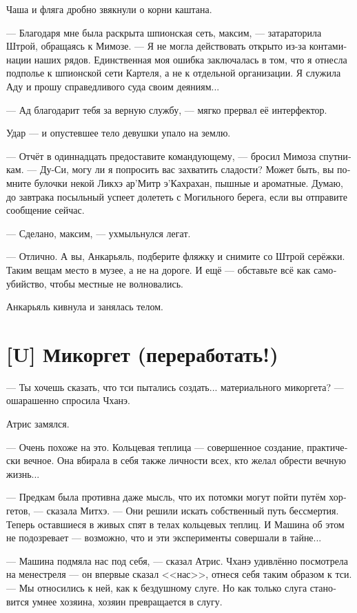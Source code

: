 \documentclass[a4paper,12pt,fleqn]{book}\usepackage{cooltooltips}\usepackage{polyglossia}\setdefaultlanguage[babelshorthands=true]{russian}\setotherlanguage{english}\defaultfontfeatures{Ligatures=TeX,Mapping=tex-text} \usepackage{xcolor}\definecolor{lightgray}{HTML}{bbbbbb}\color{lightgray}\newcommand{\ml}[3]{\textenglish{\textcolor{black}{#3}}}
\newcommand{\textspace}{\vspace{1em}{\centering\Large\bfseries<...>\par}\vspace{1em}}
\begin{document}
Чаша и фляга дробно звякнули о корни каштана.

--- Благодаря мне была раскрыта шпионская сеть, максим, --- затараторила Штрой, обращаясь к Мимозе.
--- Я не могла действовать открыто из-за контаминации наших рядов.
Единственная моя ошибка заключалась в том, что я отнесла подполье к шпионской сети Картеля, а не к отдельной организации.
Я служила Аду и прошу справедливого суда своим деяниям...

--- Ад благодарит тебя за верную службу, --- мягко прервал её интерфектор.

Удар --- и опустевшее тело девушки упало на землю.

--- Отчёт в одиннадцать предоставите командующему, --- бросил Мимоза спутникам.
--- Ду-Си, могу ли я попросить вас захватить сладости?
Может быть, вы помните булочки некой Ликхэ ар’Митр э’Кахрахан, пышные и ароматные.
Думаю, до завтрака посыльный успеет долететь с Могильного берега, если вы отправите сообщение сейчас.

--- Сделано, максим, --- ухмыльнулся легат.

--- Отлично.
А вы, Анкарьяль, подберите фляжку и снимите со Штрой серёжки.
Таким вещам место в музее, а не на дороге.
И ещё --- обставьте всё как самоубийство, чтобы местные не волновались.

Анкарьяль кивнула и занялась телом.

\section{[U] Микоргет (переработать!)}

\textspace

--- Ты хочешь сказать, что тси пытались создать... материального микоргета? --- ошарашенно спросила Чханэ.

Атрис замялся.

--- Очень похоже на это.
Кольцевая теплица --- совершенное создание, практически вечное.
Она вбирала в себя также личности всех, кто желал обрести вечную жизнь...

--- Предкам была противна даже мысль, что их потомки могут пойти путём хоргетов, --- сказала Митхэ.
--- Они решили искать собственный путь бессмертия.
Теперь оставшиеся в живых спят в телах кольцевых теплиц.
И Машина об этом не подозревает --- возможно, что и эти эксперименты совершали в тайне...

--- Машина подмяла нас под себя, --- сказал Атрис.
Чханэ удивлённо посмотрела на менестреля --- он впервые сказал <<нас>>, отнеся себя таким образом к тси.
--- Мы относились к ней, как к бездушному слуге.
Но как только слуга становится умнее хозяина, хозяин превращается в слугу.
\end{document}

